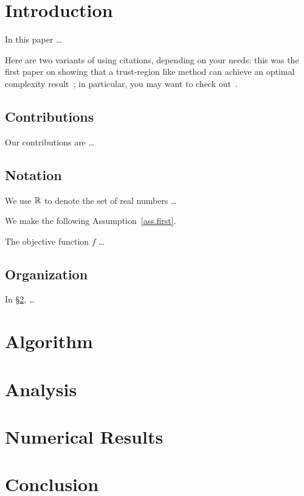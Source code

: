 
\section{Introduction}\label{sec.introduction}

In this paper \dots

Here are two variants of using citations, depending on your needs: this was the first paper on showing that a trust-region like method can achieve an optimal complexity result~\cite{CurtRobiSama17}; in particular, you may want to check out~\cite[Theorem~3.28]{CurtRobiSama17}.

\subsection{Contributions}

Our contributions are \dots

\subsection{Notation}

We use $\mathbb{R}^{}$ to denote the set of real numbers \dots

We make the following Assumption~\ref{ass.first}.

\bassumption\label{ass.first}
  The objective function $f$ \dots
\eassumption

\subsection{Organization}

In \S\ref{sec.algorithm}, \dots

\section{Algorithm}\label{sec.algorithm}

\section{Analysis}\label{sec.analysis}

\section{Numerical Results}\label{sec.numerical}

\section{Conclusion}\label{sec.conclusion}
